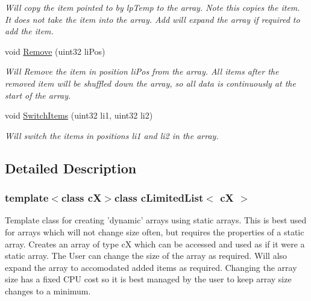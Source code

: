 \begin{DoxyCompactItemize}
\begin{DoxyCompactList}\small\item\em Will copy the item pointed to by lpTemp to the array. Note this copies the item. It does not take the item into the array. Add will expand the array if required to add the item. \end{DoxyCompactList}\item 
\hypertarget{classc_limited_list_a944c6ae2b1e13a144cc384766f9c12ae}{
void \hyperlink{classc_limited_list_a944c6ae2b1e13a144cc384766f9c12ae}{Remove} (uint32 liPos)}
\label{classc_limited_list_a944c6ae2b1e13a144cc384766f9c12ae}

\begin{DoxyCompactList}\small\item\em Will Remove the item in position liPos from the array. All items after the removed item will be shuffled down the array, so all data is continuously at the start of the array. \end{DoxyCompactList}\item 
\hypertarget{classc_limited_list_a378286ba482d356510d9a7a7b00395d9}{
void \hyperlink{classc_limited_list_a378286ba482d356510d9a7a7b00395d9}{SwitchItems} (uint32 li1, uint32 li2)}
\label{classc_limited_list_a378286ba482d356510d9a7a7b00395d9}

\begin{DoxyCompactList}\small\item\em Will switch the items in positions li1 and li2 in the array. \end{DoxyCompactList}\end{DoxyCompactItemize}


\subsection{Detailed Description}
\subsubsection*{template$<$class cX$>$class cLimitedList$<$ cX $>$}

Template class for creating 'dynamic' arrays using static arrays. This is best used for arrays which will not change size often, but requires the properties of a static array. Creates an array of type cX which can be accessed and used as if it were a static array. The User can change the size of the array as required. Will also expand the array to accomodated added items as required. Changing the array size has a fixed CPU cost so it is best managed by the user to keep array size changes to a minimum. 

